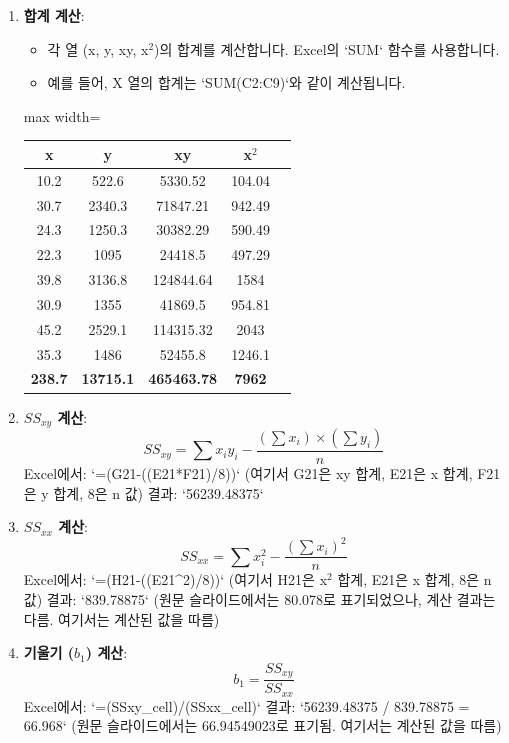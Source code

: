 \documentclass[11pt,a4paper]{article}
\begin{document}
\begin{tcolorbox}[examplebox, title=Excel 실습: 인구 및 매출 데이터]
\begin{enumerate}[label=\arabic*.]
    \item \textbf{합계 계산}:
    \begin{itemize}
        \item 각 열 (x, y, xy, x$^2$)의 합계를 계산합니다. Excel의 `SUM` 함수를 사용합니다.
        \item 예를 들어, X 열의 합계는 `SUM(C2:C9)`와 같이 계산됩니다.
    \end{itemize}
    \begin{adjustbox}{max width=\textwidth}
    \begin{tabular}{ccccc}
    \toprule
    \textbf{x} & \textbf{y} & \textbf{xy} & \textbf{x$^2$} \\
    \midrule
    10.2 & 522.6 & 5330.52 & 104.04 \\
    30.7 & 2340.3 & 71847.21 & 942.49 \\
    24.3 & 1250.3 & 30382.29 & 590.49 \\
    22.3 & 1095 & 24418.5 & 497.29 \\
    39.8 & 3136.8 & 124844.64 & 1584 \\
    30.9 & 1355 & 41869.5 & 954.81 \\
    45.2 & 2529.1 & 114315.32 & 2043 \\
    35.3 & 1486 & 52455.8 & 1246.1 \\
    \midrule
    \textbf{238.7} & \textbf{13715.1} & \textbf{465463.78} & \textbf{7962} \\
    \bottomrule
    \end{tabular}
    \end{adjustbox}

    \item \textbf{$SS_{xy}$ 계산}:
    \begin{equation*}
    SS_{xy} = \sum x_iy_i - \frac{(\sum x_i) \times (\sum y_i)}{n}
    \end{equation*}
    Excel에서: `=(G21-((E21*F21)/8))` (여기서 G21은 xy 합계, E21은 x 합계, F21은 y 합계, 8은 n 값)
    결과: `56239.48375`

    \item \textbf{$SS_{xx}$ 계산}:
    \begin{equation*}
    SS_{xx} = \sum x_i^2 - \frac{(\sum x_i)^2}{n}
    \end{equation*}
    Excel에서: `=(H21-((E21^2)/8))` (여기서 H21은 x$^2$ 합계, E21은 x 합계, 8은 n 값)
    결과: `839.78875` (원문 슬라이드에서는 80.078로 표기되었으나, 계산 결과는 다름. 여기서는 계산된 값을 따름)

    \item \textbf{기울기 ($b_1$) 계산}:
    \begin{equation*}
    b_1 = \frac{SS_{xy}}{SS_{xx}}
    \end{equation*}
    Excel에서: `=(SSxy_cell)/(SSxx_cell)`
    결과: `56239.48375 / 839.78875 = 66.968` (원문 슬라이드에서는 66.94549023로 표기됨. 여기서는 계산된 값을 따름)


\end{enumerate}
\end{tcolorbox}
\end{document}
